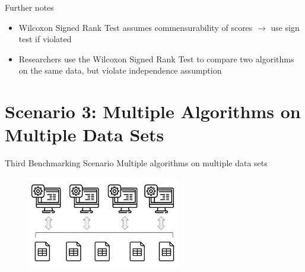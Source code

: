 \documentclass[11pt,compress,t,notes=noshow, xcolor=table]{beamer}
\begin{document}
\begin{frame}{Further notes}
    \vfill
    \begin{itemize}
        \item Wilcoxon Signed Rank Test assumes commensurability of scores $\rightarrow{}$ use sign test if violated
        \item Researchers use the Wilcoxon Signed Rank Test to compare two algorithms on the same data, but violate independence assumption
    \end{itemize}
    \vfill
\end{frame}



\section{Scenario 3: Multiple Algorithms on Multiple Data Sets}
\begin{frame}{Third Benchmarking Scenario}
\vfill
\centering
\large{Multiple algorithms on multiple data sets}
    \begin{figure}
        \includegraphics[width = 0.6\textwidth]{figure/multiplalgos_multipledatasets.png}
    \end{figure}
\vfill
\end{frame}
\end{document}
